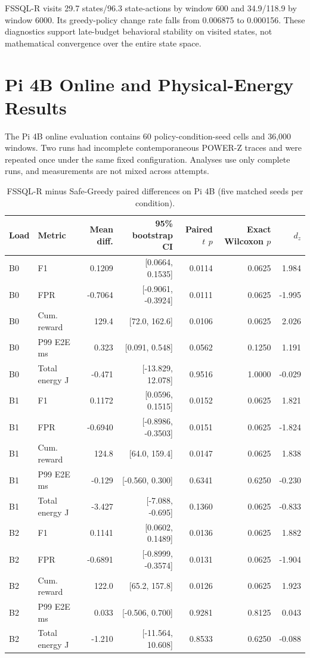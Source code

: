 \documentclass[10pt,journal]{IEEEtran}
\begin{document}
FSSQL-R visits 29.7 states/96.3 state-actions by window 600 and 34.9/118.9 by window 6000. Its greedy-policy change rate falls from 0.006875 to 0.000156. These diagnostics support late-budget behavioral stability on visited states, not mathematical convergence over the entire state space.

\section{Pi 4B Online and Physical-Energy Results}
The Pi 4B online evaluation contains 60 policy-condition-seed cells and 36,000 windows. Two runs had incomplete contemporaneous POWER-Z traces and were repeated once under the same fixed configuration. Analyses use only complete runs, and measurements are not mixed across attempts.

\begin{table}[h]
\caption{FSSQL-R minus Safe-Greedy paired differences on Pi 4B (five matched seeds per condition).}
\centering\scriptsize
\setlength{\tabcolsep}{3pt}
\begin{tabular}{llrrrrr}
\toprule
Load & Metric & Mean diff. & 95\% bootstrap CI & Paired $t$ $p$ & Exact Wilcoxon $p$ & $d_z$ \\
\midrule
B0 & F1 & 0.1209 & [0.0664, 0.1535] & 0.0114 & 0.0625 & 1.984 \\
B0 & FPR & -0.7064 & [-0.9061, -0.3924] & 0.0111 & 0.0625 & -1.995 \\
B0 & Cum. reward & 129.4 & [72.0, 162.6] & 0.0106 & 0.0625 & 2.026 \\
B0 & P99 E2E ms & 0.323 & [0.091, 0.548] & 0.0562 & 0.1250 & 1.191 \\
B0 & Total energy J & -0.471 & [-13.829, 12.078] & 0.9516 & 1.0000 & -0.029 \\
\midrule
B1 & F1 & 0.1172 & [0.0596, 0.1515] & 0.0152 & 0.0625 & 1.821 \\
B1 & FPR & -0.6940 & [-0.8986, -0.3503] & 0.0151 & 0.0625 & -1.824 \\
B1 & Cum. reward & 124.8 & [64.0, 159.4] & 0.0147 & 0.0625 & 1.838 \\
B1 & P99 E2E ms & -0.129 & [-0.560, 0.300] & 0.6341 & 0.6250 & -0.230 \\
B1 & Total energy J & -3.427 & [-7.088, -0.695] & 0.1360 & 0.0625 & -0.833 \\
\midrule
B2 & F1 & 0.1141 & [0.0602, 0.1489] & 0.0136 & 0.0625 & 1.882 \\
B2 & FPR & -0.6891 & [-0.8999, -0.3574] & 0.0131 & 0.0625 & -1.904 \\
B2 & Cum. reward & 122.0 & [65.2, 157.8] & 0.0126 & 0.0625 & 1.923 \\
B2 & P99 E2E ms & 0.033 & [-0.506, 0.700] & 0.9281 & 0.8125 & 0.043 \\
B2 & Total energy J & -1.210 & [-11.564, 10.608] & 0.8533 & 0.6250 & -0.088 \\
\bottomrule
\end{tabular}
\end{table}
\end{document}
